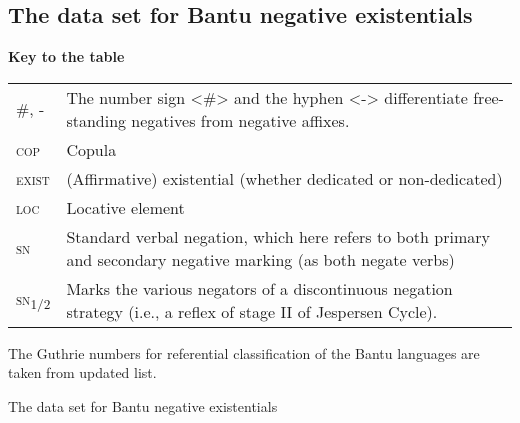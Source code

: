 \documentclass[output=paper,draft,draftmode,colorlinks,citecolor=brown]{langscibook}
\begin{document}
\begin{paperappendix}
\section{The data set for Bantu negative existentials}

\textbf{Key to the table}
\begin{tabularx}{\textwidth}{lQ}
\#, - & The number sign <\#> and the hyphen <-> differentiate free-standing negatives from negative affixes.\\
\textsc{cop}& Copula\\
\textsc{exist}& (Affirmative) existential (whether dedicated or non-dedicated)\\
\textsc{loc}& Locative element\\
\textsc{sn} & Standard verbal negation, which here refers to both primary and secondary negative marking (as both negate verbs)\\
\textsc{sn}\textsubscript{1/2} & Marks the various negators of a discontinuous negation strategy (i.e., a reflex of stage II of Jespersen Cycle).\\
\end{tabularx}
The Guthrie numbers for referential classification of the Bantu languages are taken from  updated list.

\newlength{\colguthrie}
\newlength{\colcode}
\newlength{\colconstr}%
\newlength{\coletym}\settowidth{\coletym}{1) `only, empty, in vain'}
\newlength{\colmeanings}\settowidth{\colmeanings}{other meanings (when noted)}%
\newlength{\colsource}\settowidth{\colsource}{Raharimanantsoa}

\begin{sidewaystable}[p]\caption{The data set for Bantu negative existentials}
\label{tab:1:1}
\scriptsize


\end{sidewaystable}
\end{paperappendix}
\end{document}
